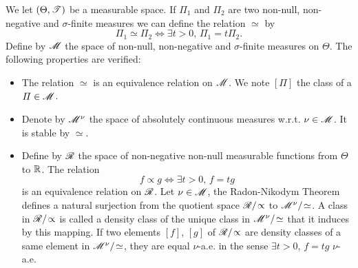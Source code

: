 We let $(\Theta,\mathscr{T})$ be a measurable space. If $\varPi_1$ and $\varPi _2$ are two non-null, non-negative and $\sigma$-finite  measures we can define the relation $\simeq$ by
    \begin{equation}
        \varPi_1\simeq\varPi_2\Longleftrightarrow\exists t>0,\,\varPi_1= t\varPi_2.
    \end{equation}
Define by $\mathscr{M}$ the space of non-null, non-negative and $\sigma$-finite measures on $\Theta$. The following properties are verified:
    \begin{itemize}
        \item The relation $\simeq$ is an equivalence relation on $\mathscr{M}$. We note $[\varPi]$ the class of a $\varPi\in\mathscr{M}$.
        \item Denote by $\mathscr{M}^\nu$ the space of absolutely continuous measures w.r.t. $\nu\in\mathscr{M}$. It is stable by $\simeq$.
        \item Define by $\mathscr{R}$ the space of non-negative non-null measurable functions from $\Theta$ to $\mathbb{R}$. The relation%
            \begin{equation}
                f\propto g \Longleftrightarrow\exists t>0,\,f= t g%
            \end{equation}
        is an equivalence relation on $\mathscr{R}$. %
        Let $\nu\in\mathscr{M}$, the Radon-Nikodym Theorem defines a natural surjection from the quotient space $\mathscr{R}/\!\propto$ to $\mathscr{M}^\nu/\!\simeq$. 
        A class in $\mathscr{R}/\!\propto$ is called a density class of the unique class in $\mathscr{M}^\nu/\!\simeq$ that it induces by this mapping. If two elements $[f]$, $[g]$ of $\mathscr{R}/\!\propto$ are density classes of a same element in $\mathscr{M}^\nu/\!\simeq$, they are equal $\nu$-a.e. in the sense $\exists t>0$, $f= t g$ $\nu$-a.e.
    \end{itemize}

